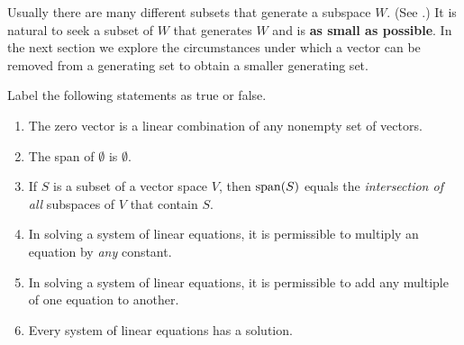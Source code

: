 \begin{remark} \label{remark 1.4.2}
Usually there are many different subsets that generate a subspace \(W\). (See .)
It is natural to seek a subset of \(W\) that generates \(W\) and is \textbf{as small as possible}.
In the next section we explore the circumstances under which a vector can be removed from a generating set to obtain a smaller generating set.
\end{remark}

\exercisesection

\begin{exercise} \label{exercise 1.4.1}
Label the following statements as true or false.
\begin{enumerate}
\item The zero vector is a linear combination of any nonempty set of vectors.
\item The span of \(\emptyset\) is \(\emptyset\).
\item If \(S\) is a subset of a vector space \(V\), then \(\operatorname{span}(S)\) equals the \emph{intersection of all} subspaces of \(V\) that contain \(S\).
\item In solving a system of linear equations, it is permissible to multiply an equation by \emph{any} constant.
\item In solving a system of linear equations, it is permissible to add any multiple of one equation to another.
\item Every system of linear equations has a solution. 
\end{enumerate}
\end{exercise}

